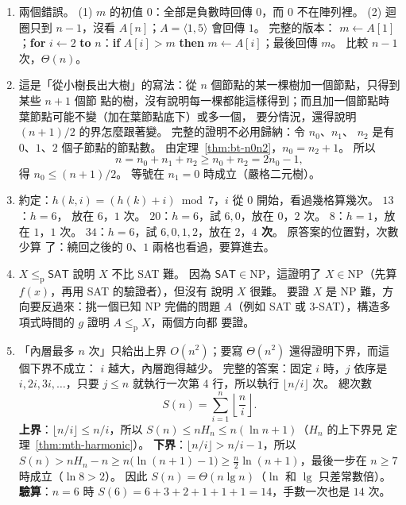 \begin{enumerate}
\item 兩個錯誤。 (1) $m$ 的初值 $0$：全部是負數時回傳 $0$，而 $0$ 不在陣列裡。 (2) 迴圈只到
$n - 1$，沒看 $A[n]$；$A = \langle 1, 5 \rangle$ 會回傳 $1$。 完整的版本：
$m \gets A[1]$；\textbf{for} $i \gets 2$ \textbf{to} $n$：\textbf{if} $A[i] > m$
\textbf{then} $m \gets A[i]$；最後回傳 $m$。 比較 $n - 1$ 次，$\Theta(n)$。

\item 這是「從小樹長出大樹」的寫法：從 $n$ 個節點的某一棵樹加一個節點，只得到某些 $n + 1$ 個節
點的樹，沒有說明每一棵都能這樣得到；而且加一個節點時葉節點可能不變（加在葉節點底下）或多一個，
要分情況，還得說明 $(n + 1)/2$ 的界怎麼跟著變。 完整的證明不必用歸納：令 $n_0$、$n_1$、
$n_2$ 是有 $0$、$1$、$2$ 個子節點的節點數。 由定理~\ref{thm:bt-n0n2}，$n_0 = n_2 + 1$。 所以
\[
n = n_0 + n_1 + n_2 \ge n_0 + n_2 = 2n_0 - 1,
\]
得 $n_0 \le (n + 1)/2$。 等號在 $n_1 = 0$ 時成立（嚴格二元樹）。

\item 約定：$h(k, i) = (h(k) + i) \bmod 7$，$i$ 從 $0$ 開始，看過幾格算幾次。 $13$：$h = 6$，
放在 $6$，$1$ 次。 $20$：$h = 6$，試 $6, 0$，放在 $0$，$2$ 次。 $8$：$h = 1$，放在 $1$，$1$
次。 $34$：$h = 6$，試 $6, 0, 1, 2$，放在 $2$，\textbf{$4$ 次}。 原答案的位置對，次數少算
了：繞回之後的 $0$、$1$ 兩格也看過，要算進去。

\item $X \le_{\mathrm{p}} \textsf{SAT}$ 說明 $X$ 不比 \textsf{SAT} 難。 因為 $\textsf{SAT} \in
\mathrm{NP}$，這證明了 $X \in \mathrm{NP}$（先算 $f(x)$，再用 \textsf{SAT} 的驗證者），但沒有
說明 $X$ 很難。 要證 $X$ 是 NP 難，方向要反過來：挑一個已知 NP 完備的問題 $A$（例如
\textsf{SAT} 或 \textsf{3-SAT}），構造多項式時間的 $g$ 證明 $A \le_{\mathrm{p}} X$，兩個方向都
要證。

\item 「內層最多 $n$ 次」只給出上界 $O(n^2)$；要寫 $\Theta(n^2)$ 還得證明下界，而這個下界不成立：
$i$ 越大，內層跑得越少。 完整的答案：固定 $i$ 時，$j$ 依序是 $i, 2i, 3i, \ldots$，只要 $j \le n$
就執行一次第 4 行，所以執行 $\lfloor n/i \rfloor$ 次。 總次數
\[
S(n) = \sum_{i=1}^{n} \left\lfloor \frac{n}{i} \right\rfloor .
\]
\textbf{上界}：$\lfloor n/i \rfloor \le n/i$，所以 $S(n) \le n H_n \le n(\ln n + 1)$（$H_n$ 的上下界見
定理~\ref{thm:mth-harmonic}）。 \textbf{下界}：$\lfloor n/i \rfloor > n/i - 1$，所以
$S(n) > n H_n - n \ge n\bigl(\ln(n + 1) - 1\bigr) \ge \frac{n}{2} \ln(n + 1)$，最後一步在
$n \ge 7$ 時成立（$\ln 8 > 2$）。 因此 $S(n) = \Theta(n \lg n)$（$\ln$ 和 $\lg$ 只差常數倍）。
\textbf{驗算}：$n = 6$ 時 $S(6) = 6 + 3 + 2 + 1 + 1 + 1 = 14$，手數一次也是 $14$ 次。


\end{enumerate}
